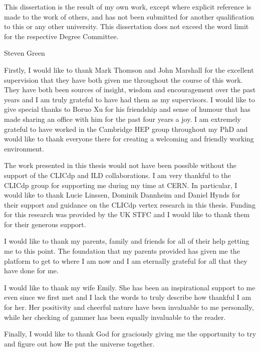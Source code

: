 \begin{declaration}
This dissertation is the result of my own work, except where explicit reference is made to the work of others, and has not been submitted for another qualification to this or any other university. This dissertation does not exceed the word limit for the respective Degree Committee.
  \vspace*{1cm}
  \begin{flushright}
    Steven Green
  \end{flushright}
\end{declaration}

\begin{acknowledgements}
Firstly, I would like to thank Mark Thomson and John Marshall for the excellent supervision that they have both given me throughout the course of this work.  They have both been sources of insight, wisdom and encouragement over the past years and I am truly grateful to have had them as my supervisors.  I would like to give special thanks to Boruo Xu for his friendship and sense of humour that has made sharing an office with him for the past four years a joy.  I am extremely grateful to have worked in the Cambridge HEP group throughout my PhD and would like to thank everyone there for creating a welcoming and friendly working environment.  

The work presented in this thesis would not have been possible without the support of the CLICdp and ILD collaborations.  I am very thankful to the CLICdp group for supporting me during my time at CERN.  In particular, I would like to thank Lucie Linssen, Dominik Dannheim and Daniel Hynds for their support and guidance on the CLICdp vertex research in this thesis.  Funding for this research was provided by the UK STFC and I would like to thank them for their generous support. 

I would like to thank my parents, family and friends for all of their help getting me to this point.  The foundation that my parents provided has given me the platform to get to where I am now and I am eternally grateful for all that they have done for me.  

I would like to thank my wife Emily.  She has been an inspirational support to me even since we first met and I lack the words to truly describe how thankful I am for her.  Her positivity and cheerful nature have been invaluable to me personally, while her checking of gammer has been equally invaluable to the reader.  

Finally, I would like to thank God for graciously giving me the opportunity to try and figure out how He put the universe together.  

\end{acknowledgements}

